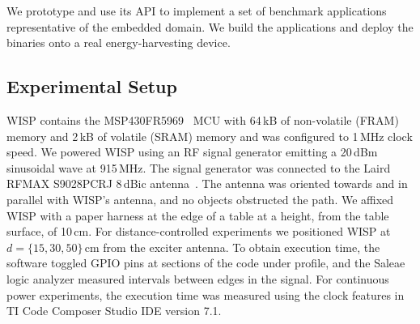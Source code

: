 We prototype \sys and use its API to implement a set of benchmark applications representative of the embedded domain. We build the applications and deploy the binaries onto a real energy-harvesting device. 


\subsection{Experimental Setup}
\label{sec:results_hardware_software}


WISP contains the MSP430FR5969~\cite{wolverine} MCU with 64\,kB of
non-volatile (FRAM) memory and 2\,kB of volatile (SRAM) memory and was
configured to 1\,MHz clock speed.
We powered WISP using an RF signal generator emitting a 20\,dBm sinusoidal wave at 915\,MHz.
The signal generator was connected to the Laird RFMAX S9028PCRJ 8\,dBic
antenna~\cite{atlas2015}.
The antenna was oriented towards and in parallel with WISP's antenna, and
no objects obstructed the path.
We affixed WISP with a paper harness at the edge of a table at a height, from the table surface, of 10\,cm.
For distance-controlled experiments we positioned WISP at $d=\{15, 30,
50\}$\,cm from the exciter antenna.
To obtain execution time, the software toggled GPIO pins at sections of the code
under profile, and the Saleae~\cite{saleae} logic analyzer measured
intervals between edges in the signal. For continuous power experiments, the 
execution time was measured using the clock features in TI Code Composer Studio IDE version 7.1.
%
